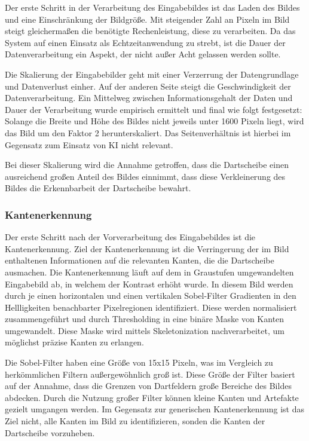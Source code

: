Der erste Schritt in der Verarbeitung des Eingabebildes ist das Laden des Bildes und eine Einschränkung der Bildgröße. Mit steigender Zahl an Pixeln im Bild steigt gleichermaßen die benötigte Rechenleistung, diese zu verarbeiten. Da das System auf einen Einsatz als Echtzeitanwendung zu strebt, ist die Dauer der Datenverarbeitung ein Aspekt, der nicht außer Acht gelassen werden sollte.

Die Skalierung der Eingabebilder geht mit einer Verzerrung der Datengrundlage und Datenverlust einher. Auf der anderen Seite steigt die Geschwindigkeit der Datenverarbeitung. Ein Mittelweg zwischen Informationsgehalt der Daten und Dauer der Verarbeitung wurde empirisch ermittelt und final wie folgt festgesetzt: Solange die Breite und Höhe des Bildes nicht jeweils unter 1600 Pixeln liegt, wird das Bild um den Faktor 2 herunterskaliert. Das Seitenverhältnis ist hierbei im Gegensatz zum Einsatz von KI nicht relevant.

Bei dieser Skalierung wird die Annahme getroffen, dass die Dartscheibe einen ausreichend großen Anteil des Bildes einnimmt, dass diese Verkleinerung des Bildes die Erkennbarbeit der Dartscheibe bewahrt.

\subsubsection{Kantenerkennung}
\label{sec:impl:align:edges}

Der erste Schritt nach der Vorverarbeitung des Eingabebildes ist die Kantenerkennung. Ziel der Kantenerkennung ist die Verringerung der im Bild enthaltenen Informationen auf die relevanten Kanten, die die Dartscheibe ausmachen.
Die Kantenerkennung läuft auf dem in Graustufen umgewandelten Eingabebild ab, in welchem der Kontrast erhöht wurde. In diesem Bild werden durch je einen horizontalen und einen vertikalen Sobel-Filter Gradienten in den Hellligkeiten benachbarter Pixelregionen identifiziert. Diese werden normalisiert zusammengeführt und durch Thresholding in eine binäre Maske von Kanten umgewandelt. Diese Maske wird mittels Skeletonization nachverarbeitet, um möglichst präzise Kanten zu erlangen.

Die Sobel-Filter haben eine Größe von 15x15 Pixeln, was im Vergleich zu herkömmlichen Filtern außergewöhnlich groß ist. Diese Größe der Filter basiert auf der Annahme, dass die Grenzen von Dartfeldern große Bereiche des Bildes abdecken. Durch die Nutzung großer Filter können kleine Kanten und Artefakte gezielt umgangen werden. Im Gegensatz zur generischen Kantenerkennung ist das Ziel nicht, alle Kanten im Bild zu identifizieren, sonden die Kanten der Dartscheibe vorzuheben.

